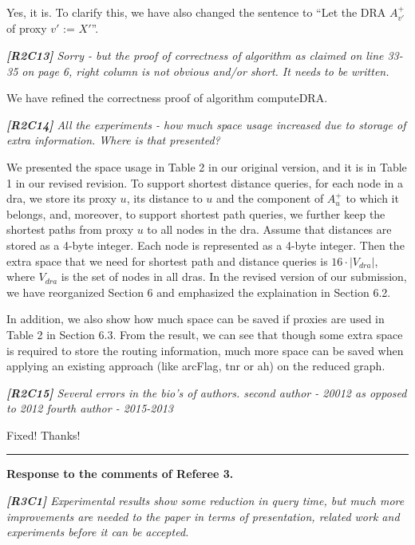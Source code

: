 \documentclass[11pt]{letter}
\newcommand{\vs}{\vspace{1ex}}
\newcommand{\svs}{\vspace{0.36ex}}
\newcommand{\ah}{{\sc ah}\xspace}
\newcommand{\arcflag}{{\sc arcFlag}\xspace}
\newcommand{\tnr}{{\sc tnr}\xspace}
\newcommand{\dra}{{\sc dra}\xspace}
\newcommand{\dras}{{\sc dra}s\xspace}
\begin{document}
Yes, it is. To clarify this, we have also changed the sentence to ``Let the DRA $A^+_{v'}$ of proxy $v'$ := $X'$''.


\vs
\noindent
{\em{\bf[R2C13]} Sorry - but the proof of correctness of algorithm as claimed on line 33-35 on page 6, right column is not obvious and/or short. It needs to be written.}

\svs
We have refined the correctness proof of algorithm computeDRA.


\vs
\noindent
{\em{\bf[R2C14]} All the experiments - how much space usage increased due to storage of extra information. Where is that presented?}

\svs
We presented the space usage in Table 2 in our original version, and it is in Table 1 in our revised revision. To support shortest distance queries, for each node in a \dra, we store its proxy $u$, its distance to $u$ and the component of $A^{+}_u$ to which it belongs, and, moreover, to support shortest path queries, we further keep the shortest paths from proxy $u$ to all nodes in the \dra. Assume that distances are stored as a 4-byte integer. Each node is represented as a 4-byte integer. Then the extra space that we need for shortest path and distance queries is $16\cdot |V_{dra}|$, where $V_{dra}$ is the set of nodes in all \dras. In the revised version of our submission, we have reorganized Section 6 and emphasized the explaination in Section 6.2.

In addition, we also show how much space can be saved if proxies are used in Table 2 in Section 6.3. From the result, we can see that though some extra space is required to store the routing information, much more space can be saved when applying an existing approach (like \arcflag, \tnr or \ah) on the reduced graph.

\vs
\noindent
{\em{\bf[R2C15]} Several errors in the bio's of authors.
second author - 20012 as opposed to 2012
fourth author - 2015-2013}

\svs
Fixed! Thanks!










\vspace{2.8ex}
\hrule
\vspace{0.6ex}
{\bf Response to the comments of Referee 3.}


\vs
\noindent
{\em{\bf[R3C1]}
Experimental results show some reduction in query time, but much more improvements are needed to the paper in terms of presentation, related work and experiments before it can be accepted.}
\svs
\end{document}
